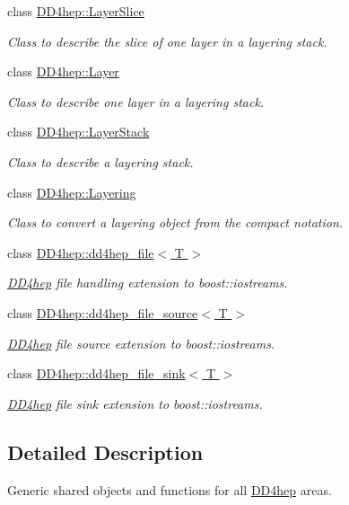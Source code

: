 \begin{DoxyCompactItemize}
class \hyperlink{class_d_d4hep_1_1_layer_slice}{DD4hep::LayerSlice}
\begin{DoxyCompactList}\small\item\em Class to describe the slice of one layer in a layering stack. \item\end{DoxyCompactList}\item 
class \hyperlink{class_d_d4hep_1_1_layer}{DD4hep::Layer}
\begin{DoxyCompactList}\small\item\em Class to describe one layer in a layering stack. \item\end{DoxyCompactList}\item 
class \hyperlink{class_d_d4hep_1_1_layer_stack}{DD4hep::LayerStack}
\begin{DoxyCompactList}\small\item\em Class to describe a layering stack. \item\end{DoxyCompactList}\item 
class \hyperlink{class_d_d4hep_1_1_layering}{DD4hep::Layering}
\begin{DoxyCompactList}\small\item\em Class to convert a layering object from the compact notation. \item\end{DoxyCompactList}\item 
class \hyperlink{class_d_d4hep_1_1dd4hep__file}{DD4hep::dd4hep\_\-file$<$ T $>$}
\begin{DoxyCompactList}\small\item\em \hyperlink{namespace_d_d4hep}{DD4hep} file handling extension to boost::iostreams. \item\end{DoxyCompactList}\item 
class \hyperlink{class_d_d4hep_1_1dd4hep__file__source}{DD4hep::dd4hep\_\-file\_\-source$<$ T $>$}
\begin{DoxyCompactList}\small\item\em \hyperlink{namespace_d_d4hep}{DD4hep} file source extension to boost::iostreams. \item\end{DoxyCompactList}\item 
class \hyperlink{class_d_d4hep_1_1dd4hep__file__sink}{DD4hep::dd4hep\_\-file\_\-sink$<$ T $>$}
\begin{DoxyCompactList}\small\item\em \hyperlink{namespace_d_d4hep}{DD4hep} file sink extension to boost::iostreams. \item\end{DoxyCompactList}\end{DoxyCompactItemize}


\subsection{Detailed Description}
Generic shared objects and functions for all \hyperlink{namespace_d_d4hep}{DD4hep} areas. 